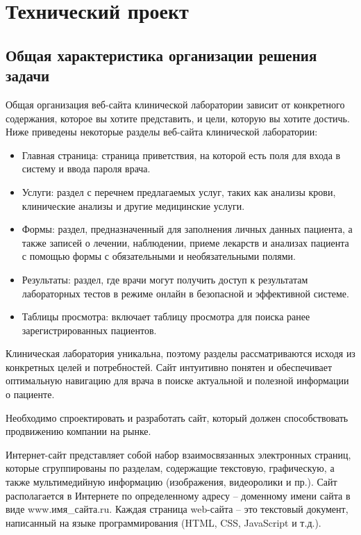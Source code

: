 \newsection
\setcounter{figure}{0}\setcounter{table}{0}
\section{Технический проект}
\subsection{Общая характеристика организации решения задачи}

Общая организация веб-сайта клинической лаборатории зависит от конкретного содержания, которое вы хотите представить, и цели, которую вы хотите достичь. Ниже приведены некоторые разделы веб-сайта клинической лаборатории:

\begin{itemize}
	\item Главная страница: страница приветствия, на которой есть поля для входа в систему и ввода пароля врача.
	\item Услуги: раздел с перечнем предлагаемых услуг, таких как анализы крови, клинические анализы и другие медицинские услуги.
	\item Формы: раздел, предназначенный для заполнения личных данных пациента, а также записей о лечении, наблюдении, приеме лекарств и анализах пациента с помощью формы с обязательными и необязательными полями.
	\item Результаты: раздел, где врачи могут получить доступ к результатам лабораторных тестов в режиме онлайн в безопасной и эффективной системе.
	\item Таблицы просмотра: включает таблицу просмотра для поиска ранее зарегистрированных пациентов.
\end{itemize}

Клиническая лаборатория уникальна, поэтому разделы рассматриваются исходя из конкретных целей и потребностей. Сайт интуитивно понятен и обеспечивает оптимальную навигацию для врача в поиске актуальной и полезной информации о пациенте.

Необходимо спроектировать и разработать сайт, который должен способствовать продвижению компании на рынке.

Интернет-сайт представляет собой набор взаимосвязанных электронных страниц, которые сгруппированы по разделам, содержащие текстовую, графическую, а также мультимедийную информацию (изображения, видеоролики и пр.). Сайт располагается в Интернете по определенному адресу – доменному имени сайта в виде www.имя\_сайта.ru. Каждая страница web-сайта – это текстовый документ, написанный на языке программирования (HTML, CSS, JavaScript и т.д.).

